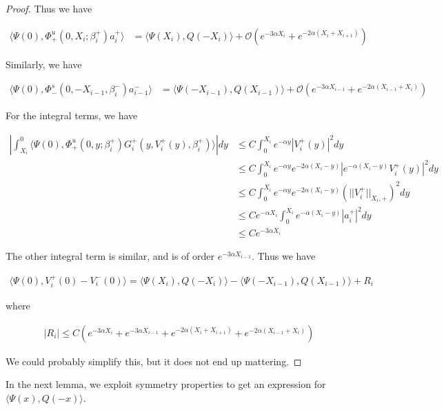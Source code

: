 \documentclass[thesis.tex]{subfiles}
\begin{document}
\begin{lemma}
\begin{proof}
Thus we have

\begin{align*}
\langle \Psi(0), \Phi^u_+(0, X_i; \beta_i^+) a_i^+ \rangle
&= \langle \Psi(X_i), Q(-X_i) \rangle + \mathcal{O}(e^{-3 \alpha X_i} + e^{-2 \alpha (X_i + X_{i+1})})
\end{align*}

Similarly, we have

\begin{align*}
 \langle \Psi(0), \Phi^s_-(0, -X_{i-1}, \beta_i^-) a_{i-1}^- \rangle 
&= \langle \Psi(-X_{i-1}), Q(X_{i-1}) \rangle + \mathcal{O}(e^{-3 \alpha X_{i-1}} + e^{-2 \alpha (X_{i-1} + X_i)}) 
\end{align*}

For the integral terms, we have

\begin{align*}
\left| \int_{X_i}^0 \langle \Psi(0), \Phi_+^u(0, y; \beta_i^+) G_i^+(y, V_i^+(y),\beta_i^+) \rangle \right| dy &\leq C \int_0^{X_i} e^{-\alpha y} |V_i^+(y)|^2 dy \\
&\leq C \int_0^{X_i} e^{-\alpha y} e^{-2 \alpha(X_i - y)}|e^{-\alpha (X_i - y)} V_i^+(y)|^2 dy \\
&\leq C \int_0^{X_i} e^{-\alpha y} e^{-2 \alpha(X_i - y)}(||V_i^+||_{X_i, +})^2 dy \\
&\leq C e^{-\alpha X_i} \int_0^{X_i} e^{-\alpha (X_i - y)} |a_i^+|^2 dy \\
&\leq C e^{-3 \alpha X_i}
\end{align*}

The other integral term is similar, and is of order $e^{-3 \alpha X_{i-1}}$. Thus we have

\begin{align*}
\langle \Psi(0), V_i^+(0) - V_i^-(0) \rangle = 
\langle \Psi(X_i), Q(-X_i) \rangle - \langle \Psi(-X_{i-1}), Q(X_{i-1}) \rangle + R_i
\end{align*}

where 

\begin{align*}
|R_i| \leq C ( e^{-3 \alpha X_i} +  e^{-3 \alpha X_{i-1}}
+ e^{-2 \alpha (X_i + X_{i+1})} + e^{-2 \alpha (X_{i-1} + X_i)})
\end{align*}

We could probably simplify this, but it does not end up mattering.

\end{proof}
\end{lemma}

In the next lemma, we exploit symmetry properties to get an expression for $\langle \Psi(x), Q(-x) \rangle$.
\end{document}
